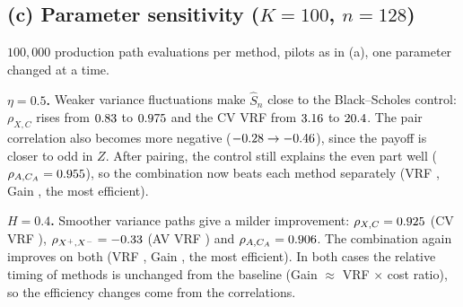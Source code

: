 \documentclass[10pt]{article}
\newcommand{\Sh}{\widehat S}
\newcommand{\R}{../results}
\begin{document}
\subsection*{(c) Parameter sensitivity ($K=100$, $n=128$)}
$100{,}000$ production path evaluations per method, pilots as in (a), one parameter changed at a time.
\begin{table}[H]\centering\small

\caption{$K=100$; coef.\ is $\hat\beta$ (CV) or $\hat\gamma$ (AV+CV). Baseline values at $K=100$: VRF CV 3.16,
AV \VRFAVb, AV+CV \VRFBOTHb; Gain \GainCVb, \GainAVb, \GainBOTHb.}\label{tab:sens}
\end{table}
\textbf{$\eta=0.5$.} Weaker variance fluctuations make $\Sh_n$ close to the Black--Scholes control:
$\rho_{X,C}$ rises from $0.83$ to $0.975$ and the CV VRF from $3.16$ to $20.4$. The pair correlation also
becomes more negative ($-0.28\to-0.46$), since the payoff is closer to odd in $Z$. After pairing, the
control still explains the even part well ($\rho_{A,C_A}=0.955$), so the combination now beats each
method separately (VRF \SEVRFBOTH, Gain \SEGainBOTH, the most efficient).

\textbf{$H=0.4$.} Smoother variance paths give a milder improvement: $\rho_{X,C}=0.925$ (CV VRF \SHVRFCV),
$\rho_{X^+,X^-}=-0.33$ (AV VRF \SHVRFAV) and $\rho_{A,C_A}=0.906$. The combination again improves on both
(VRF \SHVRFBOTH, Gain \SHGainBOTH, the most efficient). In both cases the relative timing of methods is unchanged
from the baseline (Gain $\approx$ VRF $\times$ cost ratio), so the efficiency changes come from the
correlations.
\end{document}
